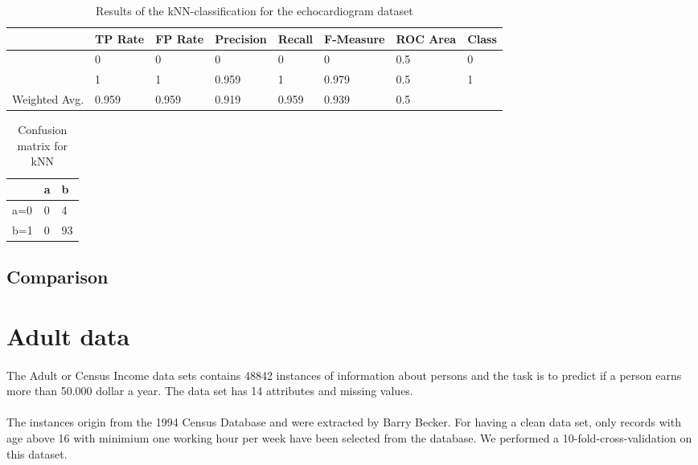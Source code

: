 \documentclass[paper=a4, fontsize=11pt]{scrartcl} %
\numberwithin{equation}{section} %
\numberwithin{figure}{section} %
\numberwithin{table}{section} %
\begin{document}
\begin{table}[h]
\centering
\begin{tabular}{|llllllll|}
	\hline
									&TP Rate   	&FP Rate   &Precision &Recall  &F-Measure   &ROC Area  &Class\\
	\hline
									&0         	&0         &0         &0       &  0         & 0.5      &0\\
  								&1         	&1         &0.959     &1       &0.979       &	0.5      &1\\
  \hline
	Weighted Avg.		&0.959     	&0.959     &0.919   	&0.959   &0.939     	&0.5				&\\
	\hline
\end{tabular}
\caption{Results of the kNN-classification for the echocardiogram dataset}
\end{table}

\vspace{6pt}

\begin{table}[h]
\centering
\begin{tabular}{|l|ll|}
\hline
 & a &	b \\
\hline
a=0 & 0 & 4 \\
b=1 & 0 & 93\\
\hline
\end{tabular}
\caption{Confusion matrix for kNN}
\end{table}


\subsection{Comparison}






\section{Adult data}

\paragraph{}The Adult or Census Income data sets contains 48842 instances of information about persons and the task is to predict if a person earns more than 50.000 dollar a year. The data set has 14 attributes and missing values.

\paragraph{}The instances origin from the 1994 Census Database and were extracted by Barry Becker. For having a clean data set, only records with age above 16 with minimium one working hour per week have been selected from the database. We performed a 10-fold-cross-validation on this dataset.
\end{document}
